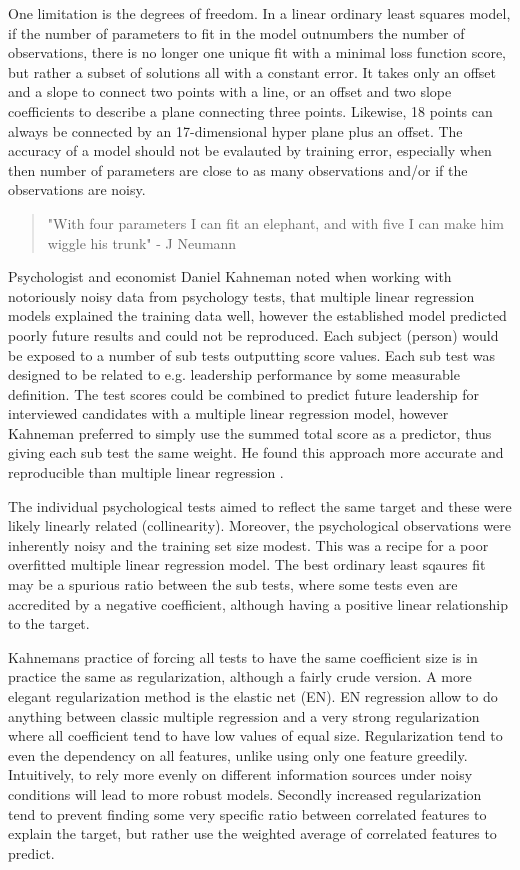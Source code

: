 One limitation is the degrees of freedom. In a linear ordinary least squares model, if the number of parameters to fit in the model outnumbers the number of observations, there is no longer one unique fit with a minimal loss function score, but rather a subset of solutions all with a constant error. It takes only an offset and a slope to connect two points with a line, or an offset and two slope coefficients to describe a plane connecting three points. Likewise, 18 points can always be connected by an 17-dimensional hyper plane plus an offset. The accuracy of a model should not be evalauted by training error, especially when then number of parameters are close to as many observations and/or if the observations are noisy.

\begin{quotation}
"With four parameters I can fit an elephant, and with five I can make him wiggle his trunk"  - J Neumann
\cite{wiki2016John}
\end{quotation}

Psychologist and economist Daniel Kahneman noted when working with notoriously noisy data from psychology tests, that multiple linear regression models explained the training data well, however the established model predicted poorly future results and could not be reproduced. Each subject (person) would be exposed to a number of sub tests outputting score values. Each sub test was designed to be related to e.g. leadership performance by some measurable definition. The test scores could be combined to predict future leadership for interviewed candidates with a multiple linear regression model, however Kahneman preferred to simply use the summed total score as a predictor, thus giving each sub test the same weight. He found this approach more accurate and reproducible than multiple linear regression \cite{kahneman2011thinking}.

The individual psychological tests aimed to reflect the same target and these were likely linearly related (collinearity). Moreover, the psychological observations were inherently noisy and the training set size modest. This was a recipe for a poor overfitted multiple linear regression model. The best ordinary least sqaures fit may be a spurious ratio between the sub tests, where some tests even are accredited by a negative coefficient, although having a positive linear relationship to the target.

Kahnemans practice of forcing all tests to have the same coefficient size is in practice the same as regularization, although a fairly crude version. A more elegant regularization method is the elastic net (EN). EN regression allow to do anything between classic multiple regression and a very strong regularization where all coefficient tend to have low values of equal size. Regularization tend to even the dependency on all features, unlike using only one feature greedily. Intuitively, to rely more evenly on different information sources under noisy conditions will lead to more robust models. Secondly increased regularization tend to prevent finding some very specific ratio between correlated features to explain the target, but rather use the weighted average of correlated features to predict.

